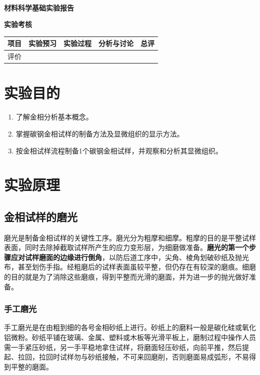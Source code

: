 \documentclass[a4paper,utf8]{article}
\begin{document}
\begin{center}
    {\mbox{}\\[7em]\bfseries\songti%
    材料科学基础实验报告}\\[34mm]
    {\bfseries\songti
    实验考核\\[3mm]
    \extrarowheight=3mm
    \begin{tabularx}{150mm}{|X|X|X|X|X|}\hline
        \hfil 项目 \hfil  & \hfil 实验预习 \hfil & \hfil 实验过程 \hfil & \hfil 分析与讨论 \hfil & \hfil 总评 \hfil \\[3mm] \hline
        \hfil 评价 \hfil &  &  &  &  \\[3mm] \hline
    \end{tabularx}
    }
\end{center}\newpage
\section{实验目的}
    \begin{enumerate}
        \item 了解金相分析基本概念。
        \item 掌握碳钢金相试样的制备方法及显微组织的显示方法。
        \item 按金相试样流程制备1个碳钢金相试样，并观察和分析其显微组织。
    \end{enumerate}
\section{实验原理}%
    \subsection{金相试样的磨光}
    磨光是制备金相试样的关键性工序。磨光分为粗摩和细摩。粗摩的目的是平整试样表面，同时去除掉截取试样所产生的应力变形层，为细磨做准备。\textbf{磨光的第一个步骤应对试样磨面的边缘进行倒角}，以防后道工序中，尖角、棱角划破砂纸及抛光布，甚至划伤手指。经粗磨后的试样表面虽较平整，但仍存在有较深的磨痕。细磨的目的就是为了消除这些磨痕，得到平整而光滑的磨面，并为进一步的抛光做好准备。
        \subsubsection{手工磨光}
        手工磨光是在由粗到细的各号金相砂纸上进行。砂纸上的磨料一般是碳化硅或氧化铝微粉。砂纸平铺在玻璃、金属、塑料或木板等光滑平板上，磨制过程中操作人员需一手紧压砂纸，另一手平稳地拿住试样，将磨面轻压砂纸，向前平推，然后提起、拉回，拉回时试样勿与砂纸接触，不可来回磨削，否则磨面易成弧形，不易得到平整的磨面。
\end{document}
